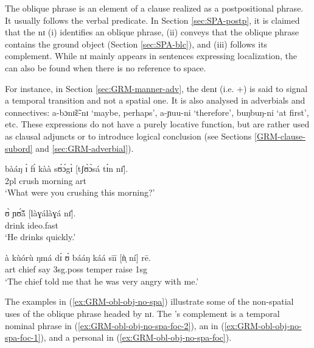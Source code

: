 \begin{exe}
\begin{exe}
\begin{exe}
The oblique phrase   is an element of a clause realized as a postpositional phrase. It usually follows the verbal predicate.  In Section \ref{sec:SPA-postp},  it is claimed that the  {\sls nɪ} (i) identifies an oblique phrase, (ii) conveys that the oblique phrase contains the ground object  (Section \ref{sec:SPA-blc}), and (iii) follows its complement. While {\sls nɪ} mainly appears in sentences expressing localization, the  can also be found when there is no  reference to space. 

For instance, in Section \ref{sec:GRM-manner-adv},  the  {\sls denɪ} (i.e. {\dem}+{\postp}) is said to signal a temporal transition and not a spatial one.  It is also analysed in adverbials and connectives: {\sls a-bɔnɪ̃ɛ̃-nɪ} `maybe, perhaps', {\sls a-ɲuu-ni} `therefore', {\sls buŋbuŋ-ni} `at first', etc. These expressions do not have a purely locative function, but are rather used as clausal adjuncts or to introduce logical conclusion (see Sections   \ref{GRM-clause-subord} and \ref{sec:GRM-adverbial}). 


\ea\label{ex:GRM-obl-obj-no-spa}

\ea\label{ex:GRM-obl-obj-no-spa-foc-2}
\gll bàáŋ ɪ̀ fɪ́ kàà sʊ́ɔ́gɪ̀ [tʃʊ̀ɔ̀sá tɪ́n nɪ̄].\\
 {\q} {\sc 2pl} {\pst} {\egr} crush  morning {\sc art} {\postp}\\
\glt  `What were you crushing this morning?' 

\ex\label{ex:GRM-obl-obj-no-spa-foc-1}
\gll ʊ̀ ɲʊ̃́ã́  [làɣálàɣá nɪ̄].\\
   {\psg} drink {\sc ideo}.fast {\postp}\\
\glt  `He drinks quickly.' 

\ex\label{ex:GRM-obl-obj-no-spa-foc}
\gll à kùórù ŋmá dɪ́ ʊ̀ bááŋ káá sīī [ǹ̩ ní] rē.\\
{\sc art} chief say {\comp} {\sc 3sg.poss} temper {\egr} raise {\sc 1sg} {\postp}
{\foc}\\
\glt  `The chief told me that he was very angry with me.' 

\z 
 \z

 The examples in (\ref{ex:GRM-obl-obj-no-spa}) illustrate some of the non-spatial uses of the oblique phrase headed by {\sls nɪ}. The 's complement is a temporal nominal phrase in (\ref{ex:GRM-obl-obj-no-spa-foc-2}), an  in  (\ref{ex:GRM-obl-obj-no-spa-foc-1}),  and a personal  in (\ref{ex:GRM-obl-obj-no-spa-foc}).


\end{exe}
\end{exe}
\end{exe}
